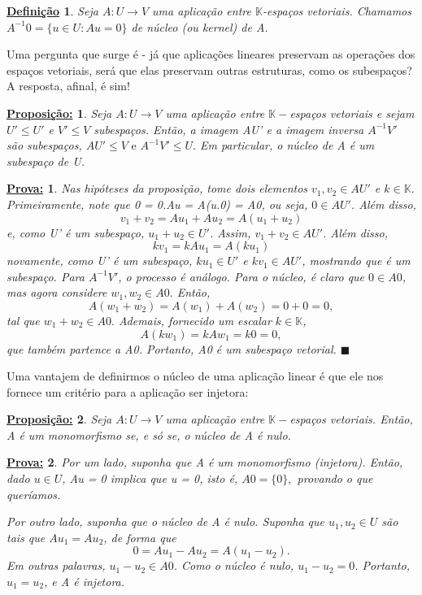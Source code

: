 \documentclass{article}
\newtheorem*{def*}{\underline{Defini\c c\~ao}}
\newtheorem*{proposition*}{\underline{Proposi\c c\~ao:}}
\newtheorem*{proof*}{\underline{Prova:}}
\renewcommand\qedsymbol{$\blacksquare$}
\begin{document}
\begin{def*}
	Seja $A:U\rightarrow{V}$ uma aplica\c c\~ao entre $\mathbb{K}$-espa\c cos vetoriais. Chamamos $A^{-1}0 =
		\{u\in{U}: Au = 0\}$ de n\'ucleo (ou kernel) de A.
\end{def*}
Uma pergunta que surge \'e - j\'a que aplica\c c\~oes lineares preservam as opera\c c\~oes dos espa\c cos vetoriais,
ser\'a que elas preservam outras estruturas, como os subespa\c cos? A resposta, afinal, \'e sim!
\begin{proposition*}
	Seja $A:U\rightarrow{V}$ uma aplica\c c\~ao entre $\mathbb{K}-$espa\c cos vetoriais e sejam $U'\leq{U'}$ e
	$V'\leq{V}$ subespa\c cos. Ent\~ao, a imagem AU' e a imagem inversa $A^{-1}V'$ s\~ao subespa\c cos,
	$AU'\leq{V} \text{ e } A^{-1}V'\leq{U}.$ Em particular, o n\'ucleo de A \'e um subespa\c co de U.
\end{proposition*}
\begin{proof*}
	Nas hip\'oteses da proposi\c c\~ao, tome dois elementos $v_1, v_2\in{AU'}$ e $k\in\mathbb{K}$. Primeiramente,
	note que 0 = 0.Au = A(u.0) = A0, ou seja, $0\in{AU'}$. Al\'em disso,
	$$
		v_1 + v_2 = Au_1 + Au_2 = A(u_1 + u_2)
	$$
	e, como U' \'e um subespa\c co, $u_1 + u_2\in{U'}$. Assim, $v_1 + v_2\in{AU'}$. Al\'em disso,
	$$
		kv_1 =  kAu_1 = A(ku_1)
	$$
	novamente, como U' \'e um subespa\c co, $ku_1\in{U'}$ e $kv_1\in{AU'}$, mostrando que \'e um subespa\c co. Para
	$A^{-1}V'$, o processo \'e an\'alogo. Para o n\'ucleo, \'e claro que $0\in{A0}$, mas agora considere
	$w_1, w_2\in{A0}.$ Ent\~ao,
	$$
		A(w_1 + w_2) = A(w_1) + A(w_2) = 0 + 0 = 0,
	$$
	tal que $w_1 + w_2\in{A0}.$ Ademais, fornecido um escalar $k\in\mathbb{K}$,
	$$
		A(kw_1) = kAw_1 = k0 = 0,
	$$
	que tamb\'em partence a A0. Portanto, A0 \'e um subespa\c co vetorial.
	\qedsymbol
\end{proof*}
Uma vantajem de definirmos o n\'ucleo de uma aplica\c c\~ao linear \'e que ele nos fornece um crit\'erio para
a aplica\c c\~ao ser injetora:
\begin{proposition*}
	Seja $A:U\rightarrow{V}$ uma aplica\c c\~ao entre $\mathbb{K}-$espa\c cos vetoriais. Ent\~ao, A \'e um
	monomorfismo se, e s\'o se, o n\'ucleo de A \'e nulo.
\end{proposition*}
\begin{proof*}
	Por um lado, suponha que A \'e um monomorfismo (injetora). Ent\~ao, dado $u\in{U}$, Au = 0 implica que u = 0,
	isto \'e, $A0 = \{0\},$ provando o que quer\'iamos.

	Por outro lado, suponha que o n\'ucleo de A \'e nulo. Suponha que $u_1, u_2\in{U}$ s\~ao tais que $Au_1 = Au_2$,
	de forma que
	$$
		0 = Au_1 - Au_2 = A(u_1 - u_2).
	$$
	Em outras palavras, $u_1 - u_2\in{A0}$. Como o n\'ucleo \'e nulo, $u_1 - u_2 = 0$. Portanto, $u_1 = u_2$, e A
	\'e injetora.
\end{proof*}
\end{document}
